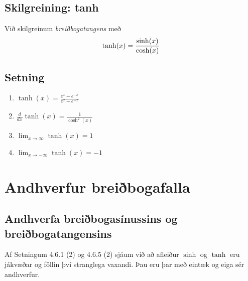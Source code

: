 \documentclass[b5paper,10pt,icelandic]{sphinxmanual}
\begin{document}
\subsection{Skilgreining: tanh}
\label{kafli04:skilgreining-tanh}
Við skilgreinum \textit{breiðbogatangens} með
\begin{gather}
\begin{split}\tanh(x) = \frac{\sinh(x)}{\cosh(x)}\end{split}\notag
\end{gather}

\subsection{Setning}
\label{kafli04:id10}\begin{enumerate}
\item {} 
\(\tanh(x) = \frac{e^x-e^{-x}}{e^x+e^{-x}}\)

\item {} 
\(\frac d{dx} \tanh(x) = \frac{1}{\cosh^2(x)}\)

\item {} 
\(\lim_{x\to \infty} \tanh(x) = 1\)

\item {} 
\(\lim_{x\to -\infty} \tanh(x) = -1\)

\end{enumerate}


\section{Andhverfur breiðbogafalla}
\label{kafli04:andhverfur-breibogafalla}

\subsection{Andhverfa breiðbogasínussins og breiðbogatangensins}
\label{kafli04:andhverfa-breibogasinussins-og-breibogatangensins}
Af Setningum 4.6.1 (2) og 4.6.5 (2) sjáum við að afleiður \(\sinh\) og
\(\tanh\) eru jákvæðar og föllin því stranglega vaxandi. Þau eru þar
með eintæk og eiga sér andhverfur.
\end{document}
